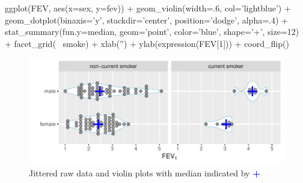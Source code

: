 \begin{Schunk}
\begin{Sinput}
ggplot(FEV, aes(x=sex, y=fev)) +
  geom_violin(width=.6, col='lightblue') +
  geom_dotplot(binaxis='y', stackdir='center', position='dodge', alpha=.4) +
  stat_summary(fun.y=median, geom='point', color='blue', shape='+', size=12) +
  facet_grid(~ smoke) +
  xlab('') + ylab(expression(FEV[1])) + coord_flip()
\end{Sinput}
\begin{figure}[htbp]

\centerline{\includegraphics[width=\maxwidth]{descript-vplot-1} }

\caption[Jittered raw data and violin plots with median indicated by \textbf{\textcolor{blue}{+}}]{Jittered raw data and violin plots with median indicated by \textbf{\textcolor{blue}{+}}}\label{fig:descript-vplot}
\end{figure}
\end{Schunk}

  
